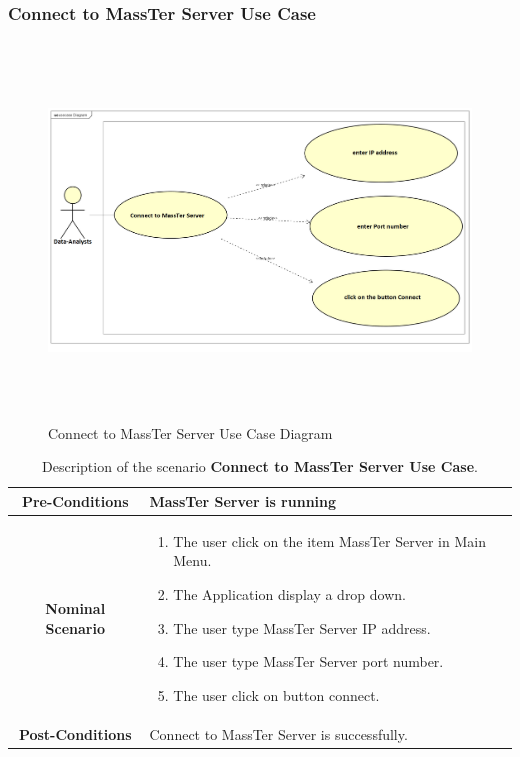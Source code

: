 	 \subsubsection{Connect to MassTer Server Use Case}
	 	\begin{figure}[h]
	 	\centering
	 	\includegraphics[width=16.5cm,height=10cm]{connectToMassTerServer.png}
	 	\caption{Connect to MassTer Server Use Case Diagram}
	 	
	 \end{figure}

  \newpage
 
 \begin{table}
 	\caption{Description of the scenario \textbf{Connect to MassTer Server Use Case}.}
 	\label{DSTabCTMS}
 	\centering
 	
 	\begin{tabular}{|c|p{10cm}|}
 		\hline 	
 		\textbf{Pre-Conditions } & MassTer Server is running  \\ 
 		\hline                     
 		\textbf{Nominal Scenario } & \begin{enumerate}
 			\item The user click on the item MassTer Server in Main Menu.
 			\item The Application display a drop down. 
 			\item The user type MassTer Server IP address.
 			\item The user type MassTer Server port number.
 			\item The  user click on button connect. 
 		\end{enumerate} \\ 
 		\hline 
 		\textbf{Post-Conditions} & Connect to MassTer Server is successfully. \\
 		\hline 
 	\end{tabular}
 \end{table}
 \clearpage
 \newpage
